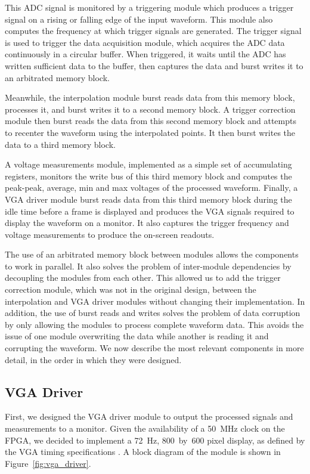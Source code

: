 \documentclass[journal]{IEEEtran}
\begin{document}
This ADC signal is monitored by a triggering module which produces a trigger signal on a rising or falling edge of the input waveform. This module also computes the frequency at which trigger signals are generated. The trigger signal is used to trigger the data acquisition module, which acquires the ADC data continuously in a circular buffer. When triggered, it waits until the ADC has written sufficient data to the buffer, then captures the data and burst writes it to an arbitrated memory block.

Meanwhile, the interpolation module burst reads data from this memory block, processes it, and burst writes it to a second memory block. A trigger correction module then burst reads the data from this second memory block and attempts to recenter the waveform using the interpolated points. It then burst writes the data to a third memory block.

A voltage measurements module, implemented as a simple set of accumulating registers, monitors the write bus of this third memory block and computes the peak-peak, average, min and max voltages of the processed waveform. Finally, a VGA driver module burst reads data from this third memory block during the idle time before a frame is displayed and produces the VGA signals required to display the waveform on a monitor. It also captures the trigger frequency and voltage measurements to produce the on-screen readouts.

The use of an arbitrated memory block between modules allows the components to work in parallel. It also solves the problem of inter-module dependencies by decoupling the modules from each other. This allowed us to add the trigger correction module, which was not in the original design, between the interpolation and VGA driver modules without changing their implementation. In addition, the use of burst reads and writes solves the problem of data corruption by only allowing the modules to process complete waveform data. This avoids the issue of one module overwriting the data while another is reading it and corrupting the waveform. We now describe the most relevant components in more detail, in the order in which they were designed.

\subsection{VGA Driver}

First, we designed the VGA driver module to output the processed signals and measurements to a monitor. Given the availability of a 50~MHz clock on the FPGA, we decided to implement a 72~Hz, 800~by~600 pixel display, as defined by the VGA timing specifications \cite{vga_timing}. A block diagram of the module is shown in Figure~\ref{fig:vga_driver}.
\end{document}
